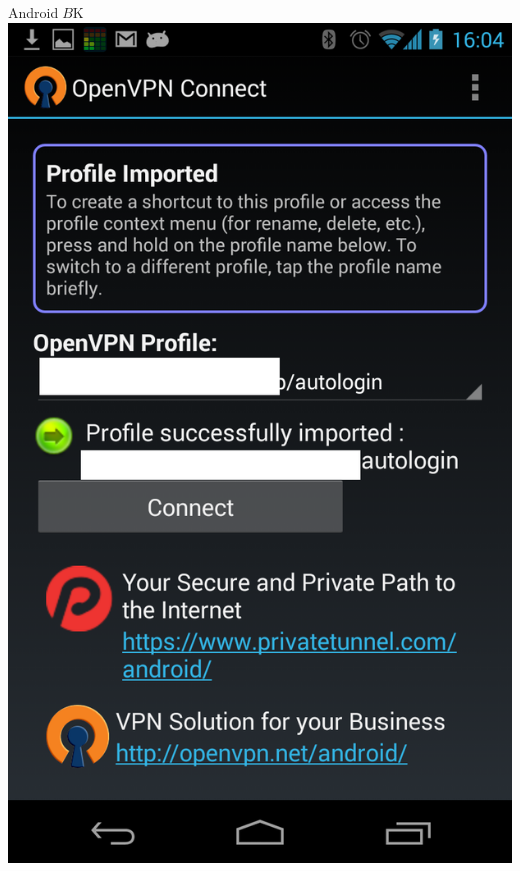 {{{\begin{frame}
{\end{frame}
\begin{frame}{Android$B$K%
\includegraphics[height=0.9\vsize,bb=0 0 768 1280]{image201308/Screenshot_2013-08-17-16-04-54.png}

}
\end{frame}}}}

